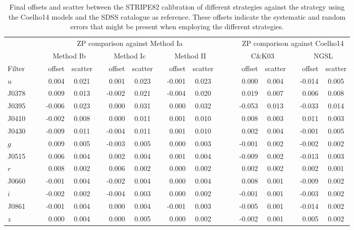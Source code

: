 \documentclass[fleqn,usenatbib]{mnras}
\begin{document}
\begin{table*}
\caption{Final offsets and scatter between the STRIPE82 calibration of different strategies against the strategy using the Coelho14 models and the SDSS catalogue as reference. These offsets indicate the systematic and random errors that might be present when employing the different strategies.}
\label{tab:ref_comp_final}
\begin{tabular}{lrccrccrcccrccrc}
\hline \hline
& \multicolumn{8}{c}{ZP comparison against Method Ia} & \,\, & \,\, & \multicolumn{5}{c}{ZP comparison against Coelho14} \\ \cmidrule(lr){2-9} \cmidrule(lr){12-16}
& \multicolumn{2}{c}{Method Ib} && \multicolumn{2}{c}{Method Ic}  && \multicolumn{2}{c}{Method II} &&& \multicolumn{2}{c}{C\&K03}  && \multicolumn{2}{c}{NGSL} \\ \cmidrule(lr){2-3}\cmidrule(lr){5-6}\cmidrule(lr){8-9}\cmidrule(lr){12-13}\cmidrule(lr){15-16}
Filter$\quad\quad$ & offset & scatter && offset & scatter && offset & scatter &&& offset & scatter && offset & scatter \\ \hline \hline
$u$    &  0.004 & 0.021 &&  0.001 & 0.023 && -0.001 & 0.023 &&&  0.000 & 0.004 && -0.014 & 0.005 \\
J0378 &  0.009 & 0.013 && -0.002 & 0.021 && -0.004 & 0.020 &&&  0.019 & 0.007 &&  0.006 & 0.008 \\
J0395 & -0.006 & 0.023 &&  0.000 & 0.031 &&  0.000 & 0.032 &&& -0.053 & 0.013 && -0.033 & 0.014 \\
J0410 & -0.002 & 0.008 &&  0.000 & 0.011 &&  0.001 & 0.010 &&&  0.008 & 0.003 &&  0.011 & 0.003 \\
J0430 & -0.009 & 0.011 && -0.004 & 0.011 &&  0.001 & 0.010 &&&  0.002 & 0.004 && -0.001 & 0.005 \\
$g$    &  0.009 & 0.005 && -0.003 & 0.005 &&  0.000 & 0.003 &&& -0.001 & 0.002 && -0.002 & 0.002 \\
J0515 &  0.006 & 0.004 &&  0.002 & 0.004 &&  0.001 & 0.004 &&& -0.009 & 0.002 && -0.013 & 0.003 \\
$r$    &  0.008 & 0.002 &&  0.006 & 0.002 &&  0.000 & 0.002 &&&  0.002 & 0.002 &&  0.002 & 0.001 \\
J0660 & -0.001 & 0.004 && -0.002 & 0.004 &&  0.000 & 0.004 &&&  0.008 & 0.001 && -0.009 & 0.002 \\
$i$    & -0.002 & 0.002 && -0.004 & 0.003 &&  0.000 & 0.002 &&& -0.001 & 0.001 && -0.003 & 0.002 \\
J0861 & -0.001 & 0.004 &&  0.000 & 0.004 && -0.001 & 0.003 &&& -0.005 & 0.001 && -0.014 & 0.002 \\
$z$    &  0.000 & 0.004 &&  0.000 & 0.005 &&  0.000 & 0.002 &&& -0.002 & 0.001 &&  0.005 & 0.002 \\
\hline \hline
\end{tabular}
\end{table*}
\end{document}
